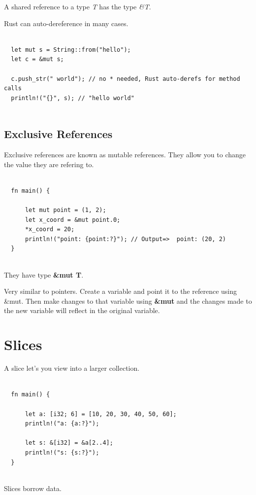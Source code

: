 \documentclass[11pt]{article}
\begin{document}
A shared reference to a type \emph{T} has the type \emph{\&T}.

Rust can auto-dereference in many cases.

\begin{verbatim}

  let mut s = String::from("hello");
  let c = &mut s;

  c.push_str(" world"); // no * needed, Rust auto-derefs for method calls
  println!("{}", s); // "hello world"


\end{verbatim}
\subsection{Exclusive References}
\label{sec:org9cc2567}

Exclusive references are known as mutable references. They allow you to change the value they are refering to.

\begin{verbatim}

  fn main() {

      let mut point = (1, 2);
      let x_coord = &mut point.0;
      *x_coord = 20;
      println!("point: {point:?}"); // Output=>  point: (20, 2)
  }


\end{verbatim}

They have type \textbf{\&mut T}.

Very similar to pointers. Create a variable and point it to the reference using \&mut.
Then make changes to that variable using \textbf{\&mut} and the changes made to the new variable will reflect in the original variable.
\section{Slices}
\label{sec:org627c091}

A slice let's you view into a larger collection.

\begin{verbatim}

  fn main() {

      let a: [i32; 6] = [10, 20, 30, 40, 50, 60];
      println!("a: {a:?}");

      let s: &[i32] = &a[2..4];
      println!("s: {s:?}");
  }


\end{verbatim}

Slices borrow data.
\end{document}
